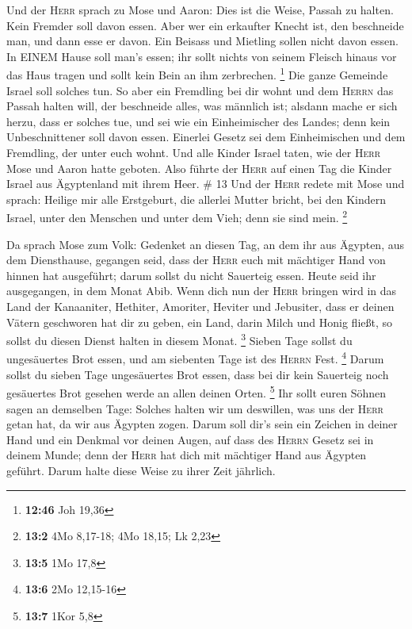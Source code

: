  Und der \textsc{Herr} sprach zu Mose und Aaron: Dies ist
die Weise, Passah zu halten. Kein Fremder soll davon essen.
 Aber wer ein erkaufter Knecht ist, den beschneide man,
und dann esse er davon.  Ein Beisass und Mietling sollen
nicht davon essen.  In EINEM Hause soll man's essen; ihr
sollt nichts von seinem Fleisch hinaus vor das Haus tragen und sollt
kein Bein an ihm zerbrechen. \footnote{\textbf{12:46} Joh 19,36}
 Die ganze Gemeinde Israel soll solches tun.
 So aber ein Fremdling bei dir wohnt und dem
\textsc{Herrn} das Passah halten will, der beschneide alles, was
männlich ist; alsdann mache er sich herzu, dass er solches tue, und sei
wie ein Einheimischer des Landes; denn kein Unbeschnittener soll davon
essen.  Einerlei Gesetz sei dem Einheimischen und dem
Fremdling, der unter euch wohnt.  Und alle Kinder Israel
taten, wie der \textsc{Herr} Mose und Aaron hatte geboten.
 Also führte der \textsc{Herr} auf einen Tag die Kinder
Israel aus Ägyptenland mit ihrem Heer. \# 13  Und der
\textsc{Herr} redete mit Mose und sprach:  Heilige mir
alle Erstgeburt, die allerlei Mutter bricht, bei den Kindern Israel,
unter den Menschen und unter dem Vieh; denn sie sind mein. \footnote{\textbf{13:2}
  4Mo 8,17-18; 4Mo 18,15; Lk 2,23}

 Da sprach Mose zum Volk: Gedenket an diesen Tag, an dem
ihr aus Ägypten, aus dem Diensthause, gegangen seid, dass der
\textsc{Herr} euch mit mächtiger Hand von hinnen hat ausgeführt; darum
sollst du nicht Sauerteig essen.  Heute seid ihr
ausgegangen, in dem Monat Abib.  Wenn dich nun der
\textsc{Herr} bringen wird in das Land der Kanaaniter, Hethiter,
Amoriter, Heviter und Jebusiter, dass er deinen Vätern geschworen hat
dir zu geben, ein Land, darin Milch und Honig fließt, so sollst du
diesen Dienst halten in diesem Monat. \footnote{\textbf{13:5} 1Mo 17,8}
 Sieben Tage sollst du ungesäuertes Brot essen, und am
siebenten Tage ist des \textsc{Herrn} Fest. \footnote{\textbf{13:6} 2Mo
  12,15-16}  Darum sollst du sieben Tage ungesäuertes Brot
essen, dass bei dir kein Sauerteig noch gesäuertes Brot gesehen werde an
allen deinen Orten. \footnote{\textbf{13:7} 1Kor 5,8}  Ihr
sollt euren Söhnen sagen an demselben Tage: Solches halten wir um
deswillen, was uns der \textsc{Herr} getan hat, da wir aus Ägypten
zogen.  Darum soll dir's sein ein Zeichen in deiner Hand
und ein Denkmal vor deinen Augen, auf dass des \textsc{Herrn} Gesetz sei
in deinem Munde; denn der \textsc{Herr} hat dich mit mächtiger Hand aus
Ägypten geführt.  Darum halte diese Weise zu ihrer Zeit
jährlich.

